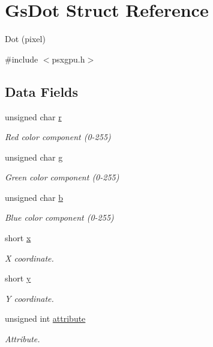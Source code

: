 \hypertarget{structGsDot}{}\section{Gs\+Dot Struct Reference}
\label{structGsDot}


Dot (pixel)  




{\ttfamily \#include $<$psxgpu.\+h$>$}

\subsection*{Data Fields}
\begin{DoxyCompactItemize}
\item 
unsigned char \hyperlink{structGsDot_a319bcb88e61d9c53c2955741cd606664}{r}
\begin{DoxyCompactList}\small\item\em Red color component (0-\/255) \end{DoxyCompactList}\item 
unsigned char \hyperlink{structGsDot_adf5853b35a2beaae08ae0470b946475e}{g}
\begin{DoxyCompactList}\small\item\em Green color component (0-\/255) \end{DoxyCompactList}\item 
unsigned char \hyperlink{structGsDot_ad0f6124b5faafdd9a5870f4c30d454d8}{b}
\begin{DoxyCompactList}\small\item\em Blue color component (0-\/255) \end{DoxyCompactList}\item 
short \hyperlink{structGsDot_a3cbac231ecaa41fb57f867895fca1891}{x}
\begin{DoxyCompactList}\small\item\em X coordinate. \end{DoxyCompactList}\item 
short \hyperlink{structGsDot_af152c90f2f5a80201f7736d4ed84d61b}{y}
\begin{DoxyCompactList}\small\item\em Y coordinate. \end{DoxyCompactList}\item 
unsigned int \hyperlink{structGsDot_ae4d3c753ac176af37039500837a9a003}{attribute}
\begin{DoxyCompactList}\small\item\em Attribute. \end{DoxyCompactList}\end{DoxyCompactItemize}


